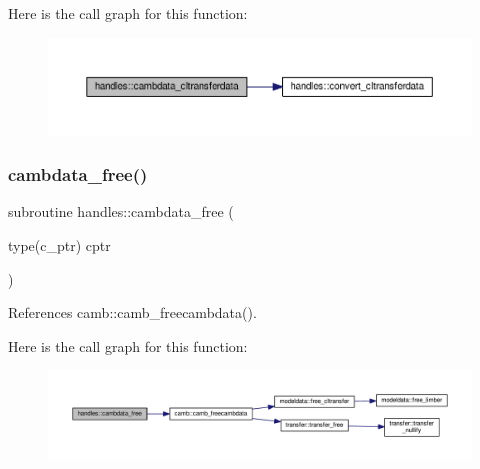Here is the call graph for this function\+:
\nopagebreak
\begin{figure}[H]
\begin{center}
\leavevmode
\includegraphics[width=350pt]{namespacehandles_ab0bb10def620b06fb617f4704d9342d9_cgraph}
\end{center}
\end{figure}
\mbox{\label{namespacehandles_ab179d576d5e788ddc19e8a8c841aeade}} 
\subsubsection{\texorpdfstring{cambdata\+\_\+free()}{cambdata\_free()}}
{\footnotesize\ttfamily subroutine handles\+::cambdata\+\_\+free (\begin{DoxyParamCaption}\item[{type(c\+\_\+ptr)}]{cptr }\end{DoxyParamCaption})}



References camb\+::camb\+\_\+freecambdata().

Here is the call graph for this function\+:
\nopagebreak
\begin{figure}[H]
\begin{center}
\leavevmode
\includegraphics[width=350pt]{namespacehandles_ab179d576d5e788ddc19e8a8c841aeade_cgraph}
\end{center}
\end{figure}
\mbox{\label{namespacehandles_accd4416ff2222813d3f9784504d7e5d8}} 

